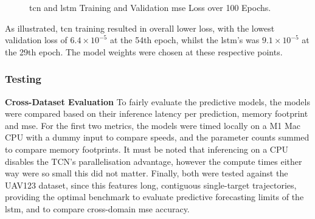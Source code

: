 \documentclass{report_template_oxford}
\begin{document}
\begin{figure}[H]
    \centering
    \caption{\gls{tcn} and \gls{lstm} Training and Validation \gls{mse} Loss over 100 Epochs.}
    \label{fig:tcn_loss}
\end{figure}

As illustrated, \gls{tcn} training resulted in overall lower loss, with the lowest validation loss of \(6.4\times10^{-5}\) at the 54th epoch, whilst the \gls{lstm}'s was \(9.1\times10^{-5}\) at the 29th epoch. The model weights were chosen at these respective points. 

\subsubsection{Testing}

\textbf{Cross-Dataset Evaluation} \quad To fairly evaluate the predictive models, the models were compared based on their inference latency per prediction, memory footprint and \gls{mse}. For the first two metrics, the models were timed locally on a M1 Mac CPU with a dummy input to compare speeds, and the parameter counts summed to compare memory footprints. It must be noted that inferencing on a CPU disables  the TCN's parallelisation advantage, however the compute times either way were so small this did not matter. Finally, both were tested against the UAV123 \cite{mueller2016benchmark} dataset, since this features long, contiguous single-target trajectories, providing the optimal benchmark to evaluate predictive forecasting limits of the \gls{lstm}, and to compare cross-domain \gls{mse} accuracy.
\end{document}
